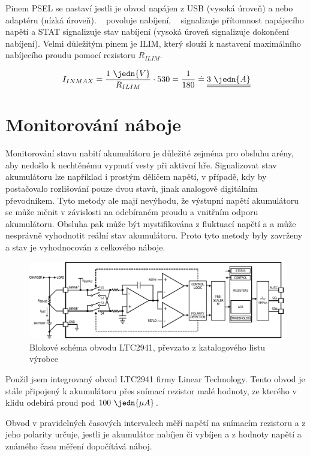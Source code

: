 Pinem PSEL se nastaví jestli je obvod napájen z USB (vysoká úroveň) a nebo adaptéru (nízká úroveň). ~ povoluje nabíjení, ~ signalizuje přítomnost napájecího napětí a STAT signalizuje stav nabíjení (vysoká úroveň signalizuje dokončení nabíjení). Velmi důležitým pinem je ILIM, který slouží k nastavení maximálního nabíjecího proudu pomocí rezistoru $R_{ILIM}$.

$$I_{IN MAX} = \dfrac{1~\jedn{V}}{R_{ILIM}} \cdot 530 = \dfrac{1}{180} \doteq \underline{\underline{3~\jedn{A}}}$$ \nonumber

\section{Monitorování náboje}
Monitorování stavu nabití akumulátoru je důležité zejména pro obsluhu arény, aby nedošlo k nechtěnému vypnutí vesty při aktivní hře. Signalizovat stav akumulátoru lze například i prostým děličem napětí, v případě, kdy by postačovalo rozlišování pouze dvou stavů, jinak analogově digitálním převodníkem. Tyto metody ale mají nevýhodu, že výstupní napětí akumulátoru se může měnit v závislosti na odebíraném proudu a vnitřním odporu akumulátoru. Obsluha pak může být mystifikována z fluktuací napětí a a může nesprávně vyhodnotit reální stav akumulátoru. Proto tyto metody byly zavrženy a stav je vyhodnocován z celkového náboje.

\begin{figure}[H]
    \begin{center}
        \includegraphics[width=\textwidth]{img/LTC2941-block}
    \end{center}
    \caption{Blokové schéma obvodu LTC2941, převzato z katalogového listu výrobce}
\end{figure}
Použil jsem integrovaný obvod LTC2941 firmy Linear Technology. Tento obvod je stále připojený k akumulátoru přes snímací rezistor malé hodnoty, ze kterého v klidu odebírá proud pod $100~\jedn{\mu A}$.

Obvod v pravidelných časových intervalech měří napětí na snímacím rezistoru a z jeho polarity určuje, jestli je akumulátor nabíjen či vybíjen a z hodnoty napětí a známého času měření dopočítává náboj.

